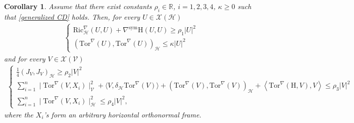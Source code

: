 \documentclass[11pt]{article}
\numberwithin{equation}{section}
\newtheorem{corollary}[theorem]{Corollary}
\newcommand{\Ho}{\mathcal H}
\newcommand{\V}{\mathcal V}
\begin{document}
    \begin{corollary}\label{General CD converse}
Assume that there exist constants $\rho_i \in \mathbb{R}$, $i=1,2,3,4$,  $\kappa \ge 0$ such that \eqref{generalized CD} holds. Then, for every $U \in \mathcal{X}(\Ho)$
\begin{align*}
\begin{cases}
\mathrm{Ric}_\Ho^\nabla(U, U )+ \nabla^{\mathrm{sym}}\mathrm H(U,U) \ge \rho_1 |U|^2 \\
(\mathrm{Tor}^\nabla (U),\mathrm{Tor}^\nabla (U ) )_\Ho \le \kappa |U|^2
\end{cases}
\end{align*}
and for every $V \in \mathcal{X}(\V)$
\begin{align*}
\begin{cases}
\frac{1}{4}( J_{V} , J_{V} )_\Ho \ge \rho_2 |V|^2 \\
 \sum_{i=1}^n\mid \mathrm{Tor}^\nabla(V, X_i)\mid_\V^2+ \langle V, \delta_\Ho \mathrm{Tor}^\nabla ( V) \rangle
		+ (\mathrm{Tor}^\nabla (V),\mathrm{Tor}^\nabla (V) )_\Ho+ \left\langle \mathrm{Tor}^\nabla (\mathrm H, V), V \right\rangle \le  \rho_3  |V |^2 \\
\sum_{i=1}^n\mid \mathrm{Tor}^\nabla(V, X_i)\mid_\Ho^2 \le \rho_4 |V|^2,
\end{cases}
\end{align*}
where the $X_i$'s form an arbitrary horizontal orthonormal frame.
    \end{corollary}
\end{document}

